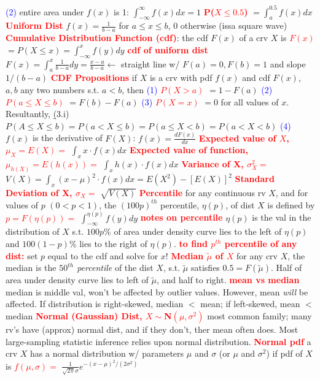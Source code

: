 \documentclass[9pt]{extarticle}
\newcommand{\re}[1]{\textcolor{red}{\textbf{#1}}}
\newcommand{\bt}[1]{\textcolor{blue}{#1}}
\begin{document}
	\bt{(2)} entire area under $f(x)$ is 1: $\int_{-\infty}^{\infty}f(x)dx = 1$
	\re{P($X\leq 0.5$)} $= \int_{a}^{0.5}f(x)dx$
	\re{Uniform Dist}
	$f(x)=\frac{1}{b-a}$ for $a\leq x \leq b$, $0$ otherwise (issa square wave)
	\re{Cumulative Distribution Function (cdf)}: the cdf $F(x)$ of a crv $X$ is
	\re{$F(x)$} $=P(X\leq x) = \int_{-\infty}^{x}f(y)dy$
	\re{cdf of uniform dist} $F(x) = \int_{a}^{x}\frac{1}{b-a}dy = \frac{x-a}{b-a} \leftarrow$
	straight line w/ $F(a)=0,F(b)=1$ and slope $1/(b-a)$
	\re{CDF Propositions} if $X$ is a crv with pdf $f(x)$ and cdf $F(x)$, $a,b$ any two numbers
	s.t. $a<b$, then
	\bt{(1)} \re{$P(X>a)$} $= 1-F(a)$
	\bt{(2)} \re{$P(a\leq X\leq b)$} $=F(b) - F(a)$
	\bt{(3)} \re{$P(X=x)$} $=0$ for all values of $x$. Resultantly,
	\b{(3.i)} $P(A\leq X\leq b) = P(a<X\leq b) = P(a\leq X < b) = P(a<X<b)$
	\bt{(4)} $f(x)$ is the derivative of $F(X)$: $f(x) = \frac{dF(x)}{dx}$
	\re{Expected value of $X$, $\mu_{X}=E(X)=$} $\int_{x}x\cdot f(x)dx$
	\re{Expected value of function, $\mu_{h(X)}=E(h(x))=$} $\int_{x}h(x)\cdot f(x)dx$
	\re{Variance of X, $\sigma_{X}^{2}=$} $V(X) = \int_{x}(x-\mu)^{2}\cdot f(x)dx
												= E(X^{2}) - [E(X)]^{2}$
	\re{Standard Deviation of X, $\sigma_{X}=$} $\sqrt{V(X)}$
	\re{Percentile} for any continuous rv $X$, and for values of $p$ $(0<p<1)$, the
	$(100p)^{th}$ percentile, $\eta(p)$, of dist $X$ is defined by
	\re{$p = F(\eta(p))=$} $\int_{-\infty}^{\eta(p)}f(y)dy$
	\re{notes on percentile} $\eta(p)$ is the val in the distribution of $X$ s.t.
	$100p\%$ of area under density curve lies to the left of $\eta(p)$ and
	$100(1-p)\%$ lies to the right of $\eta(p)$.
	\re{to find $p^{th}$ percentile of any dist:} set $p$ equal to the cdf and solve
	for $x$!
	\re{Median $\tilde\mu$ of $X$} for any crv $X$, the median is the \emph{$50^{th}$
	percentile} of the dist $X$, s.t. $\tilde\mu$ satisfies $0.5=F(\tilde\mu)$. Half
	of area under density curve lies to left of $\tilde\mu$, and half to right.
	\re{mean vs median} median is middle val, won't be affected by outlier values.
	However, mean \emph{will} be affected. If distribution is right-skewed,
	median $<$ mean; if left-skewed, mean $<$ median
	\re{Normal (Gaussian) Dist, $X\mathtt{\sim}$N$(\mu,\sigma^{2})$} most common family; many rv's have (approx) normal dist,
	and if they don't, ther mean often does. Most large-sampling statistic inference
	relies upon normal distribution.
	\re{Normal pdf} a crv $X$ has a normal distribution w/ parameters $\mu$ and $\sigma$
	(or $\mu$ and $\sigma^{2}$) if pdf of $X$ is
	\re{$f(\mu,\sigma)=$} $\frac{1}{\sqrt{2\pi}\sigma}e^{-(x-\mu)^{2}/(2\sigma^{2})}$
\end{document}
